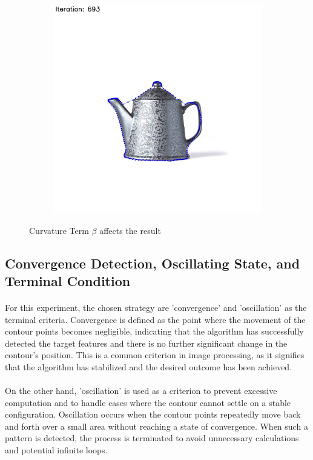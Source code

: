 \documentclass[12pt,a4paper]{report}
\begin{document}
\begin{figure}[!]
\begin{minipage}{\linewidth}
\begin{subfigure}{0.49\textwidth}
              \includegraphics[width=\linewidth]{result_img/beta_0_00001.jpg}
        \end{subfigure}

        \caption{Curvature Term \(\beta\) affects the result}
    \end{minipage}

\end{figure}


\subsection{Convergence Detection, Oscillating State, and Terminal Condition}
\paragraph*{}
For this experiment, the chosen strategy are 'convergence' and 'oscillation' as the terminal criteria. Convergence is defined as the point where the movement of the contour points becomes negligible, indicating that the algorithm has successfully detected the target features and there is no further significant change in the contour's position. This is a common criterion in image processing, as it signifies that the algorithm has stabilized and the desired outcome has been achieved.
\paragraph*{}
On the other hand, 'oscillation' is used as a criterion to prevent excessive computation and to handle cases where the contour cannot settle on a stable configuration. Oscillation occurs when the contour points repeatedly move back and forth over a small area without reaching a state of convergence. When such a pattern is detected, the process is terminated to avoid unnecessary calculations and potential infinite loops.
\end{document}
